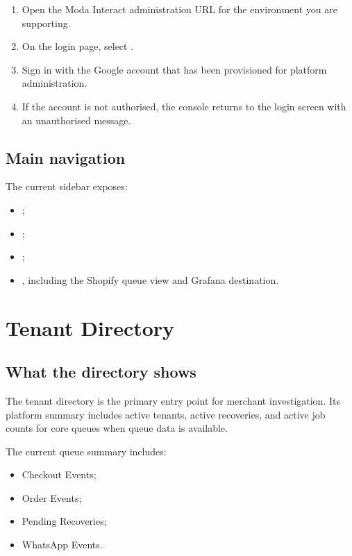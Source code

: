 \begin{enumerate}
  \item Open the Moda Interact administration URL for the environment you are supporting.
  \item On the login page, select .
  \item Sign in with the Google account that has been provisioned for platform administration.
  \item If the account is not authorised, the console returns to the login screen with an unauthorised message.
\end{enumerate}



\section{Main navigation}
The current sidebar exposes:
\begin{itemize}
  \item {};
  \item {};
  \item {};
  \item {}, including the Shopify queue view and Grafana destination.
\end{itemize}

\chapter{Tenant Directory}

\section{What the directory shows}
The tenant directory is the primary entry point for merchant investigation. Its platform summary includes active tenants, active recoveries, and active job counts for core queues when queue data is available.

The current queue summary includes:
\begin{itemize}
  \item Checkout Events;
  \item Order Events;
  \item Pending Recoveries;
  \item WhatsApp Events.
\end{itemize}

